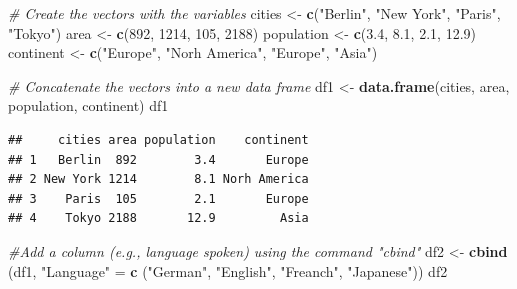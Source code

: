 \documentclass[
]{article}
\newenvironment{Shaded}{\begin{snugshade}}{\end{snugshade}}
\newcommand{\CommentTok}[1]{\textcolor[rgb]{0.56,0.35,0.01}{\textit{#1}}}
\newcommand{\DecValTok}[1]{\textcolor[rgb]{0.00,0.00,0.81}{#1}}
\newcommand{\FloatTok}[1]{\textcolor[rgb]{0.00,0.00,0.81}{#1}}
\newcommand{\FunctionTok}[1]{\textcolor[rgb]{0.13,0.29,0.53}{\textbf{#1}}}
\newcommand{\NormalTok}[1]{#1}
\newcommand{\OtherTok}[1]{\textcolor[rgb]{0.56,0.35,0.01}{#1}}
\newcommand{\StringTok}[1]{\textcolor[rgb]{0.31,0.60,0.02}{#1}}
\begin{document}
\begin{Shaded}
\begin{Highlighting}[]
\CommentTok{\# Create the vectors with the variables}
\NormalTok{cities }\OtherTok{\textless{}{-}} \FunctionTok{c}\NormalTok{(}\StringTok{"Berlin"}\NormalTok{, }\StringTok{"New York"}\NormalTok{, }\StringTok{"Paris"}\NormalTok{, }\StringTok{"Tokyo"}\NormalTok{)}
\NormalTok{area }\OtherTok{\textless{}{-}} \FunctionTok{c}\NormalTok{(}\DecValTok{892}\NormalTok{, }\DecValTok{1214}\NormalTok{, }\DecValTok{105}\NormalTok{, }\DecValTok{2188}\NormalTok{)}
\NormalTok{population }\OtherTok{\textless{}{-}} \FunctionTok{c}\NormalTok{(}\FloatTok{3.4}\NormalTok{, }\FloatTok{8.1}\NormalTok{, }\FloatTok{2.1}\NormalTok{, }\FloatTok{12.9}\NormalTok{)}
\NormalTok{continent }\OtherTok{\textless{}{-}} \FunctionTok{c}\NormalTok{(}\StringTok{"Europe"}\NormalTok{, }\StringTok{"Norh America"}\NormalTok{, }\StringTok{"Europe"}\NormalTok{, }\StringTok{"Asia"}\NormalTok{)}
\end{Highlighting}
\end{Shaded}

\begin{Shaded}
\begin{Highlighting}[]
\CommentTok{\# Concatenate the vectors into a new data frame}
\NormalTok{df1 }\OtherTok{\textless{}{-}} \FunctionTok{data.frame}\NormalTok{(cities, area, population, continent)}
\NormalTok{df1}
\end{Highlighting}
\end{Shaded}

\begin{verbatim}
##     cities area population    continent
## 1   Berlin  892        3.4       Europe
## 2 New York 1214        8.1 Norh America
## 3    Paris  105        2.1       Europe
## 4    Tokyo 2188       12.9         Asia
\end{verbatim}

\begin{Shaded}
\begin{Highlighting}[]
\CommentTok{\#Add a column (e.g., language spoken) using the command "cbind"}
\NormalTok{df2 }\OtherTok{\textless{}{-}} \FunctionTok{cbind}\NormalTok{ (df1, }\StringTok{"Language"} \OtherTok{=} \FunctionTok{c}\NormalTok{ (}\StringTok{"German"}\NormalTok{, }\StringTok{"English"}\NormalTok{, }\StringTok{"Freanch"}\NormalTok{, }\StringTok{"Japanese"}\NormalTok{))}
\NormalTok{df2}
\end{Highlighting}
\end{Shaded}
\end{document}

